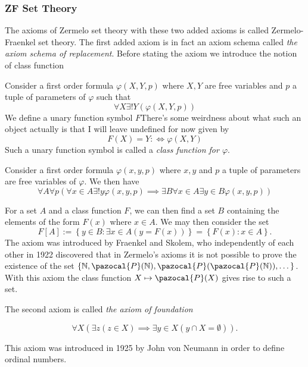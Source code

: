 \subsubsection{ZF Set Theory}
The axioms of Zermelo set theory with these two added axioms is called Zermelo-Fraenkel set theory. The first added axiom is in fact an axiom schema called \textit{the axiom schema of replacement}. Before stating the axiom we introduce the notion of class function
\begin{definition}
    Consider a first order formula $\varphi(X,Y,p)$ where $X,Y$ are free variables and $p$ a tuple of parameters of $\varphi$ such that 
    $$\forall X\exists! Y(\varphi(X,Y,p))$$
    We define a unary function symbol $F${\Large There's some weirdness about what such an object actually is that I will leave undefined for now} given by 
    $$F(X)=Y :\iff \varphi(X,Y)$$
    Such a unary function symbol is called a \textit{class function for $\varphi$}.
\end{definition}
\begin{axioms}
   Consider a first order formula $\varphi(x,y,p)$ where $x,y$ and $p$ a tuple of parameters are free variables of $\varphi$. We then have 
      $$\forall A\forall p(\forall x\in A\exists! y\varphi(x,y,p)\implies \exists B\forall x\in A\exists y\in B\varphi(x,y,p))$$
\end{axioms} 
\begin{remark}
    For a set $A$ and a class function $F$, we can then find a set $B$ containing the elements of the form $F(x)$ where $x\in A$. We may then consider the set 
    $$F[A] := \left\{ y\in B: \exists x\in A(y=F(x))\right\}=\left\{F(x) : x\in A\right\}.$$
    The axiom was introduced by Fraenkel and Skolem, who independently of each other in 1922 discovered that in Zermelo's axioms it is not possible to prove the existence of the set $\{\N,\pazocal{P}(\N),\pazocal{P}(\pazocal{P}(\N)),\dots\}$. With this axiom the class function $X\mapsto \pazocal{P}(X)$ gives rise to such a set. 
\end{remark}
The second axiom is called \textit{the axiom of foundation}
\begin{axioms}
    $$\forall X\left(\exists z(z\in X)\implies \exists y\in X(y\cap X = \emptyset)\right).$$
\end{axioms}
This axiom was introduced in 1925 by John von Neumann in order to define ordinal numbers.
